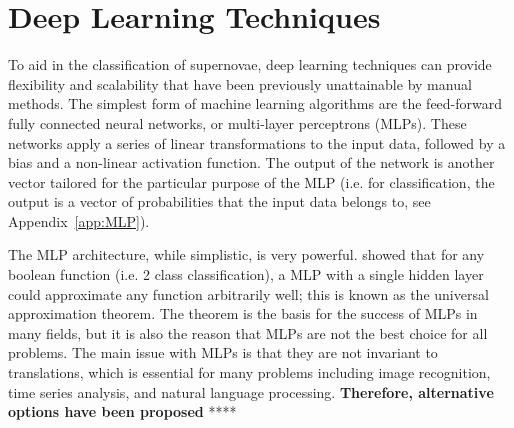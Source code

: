 \chapter{Deep Learning Techniques}
\label{chap:MLTechniques}

To aid in the classification of supernovae, deep learning techniques can provide 
flexibility and scalability that have been previously unattainable by manual 
methods. The simplest form of machine learning algorithms are the feed-forward 
fully connected neural networks, or multi-layer perceptrons (MLPs). 
These networks apply a series of linear transformations to the input data, 
followed by a bias and a non-linear activation function. The output of the 
network is another vector tailored for the particular purpose of the MLP 
(i.e. for classification, the output is a vector of probabilities 
that the input data belongs to, see Appendix~\ref{app:MLP}). 

The MLP architecture, while simplistic, is very powerful. \textcite{cybenko1989} showed that for any boolean 
function (i.e. 2 class classification), a MLP with a single hidden layer could 
approximate any function arbitrarily well; this is known as the universal approximation
theorem. The theorem is the basis for the success of MLPs in
many fields, but it is also the reason that MLPs are not the best choice for all problems.
The main issue with MLPs is that they are not invariant to translations, which is 
essential for many problems including image recognition, time series analysis, and 
natural language processing. \textbf{Therefore, alternative options have been proposed }**** 

